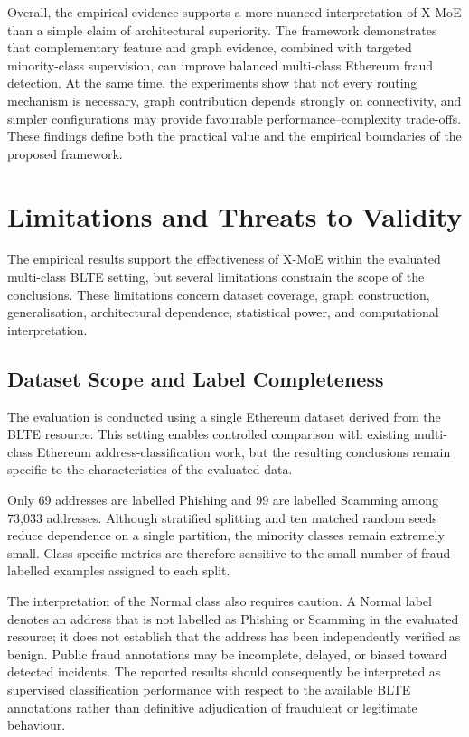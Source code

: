 \documentclass{ieeeaccess}
\begin{document}
Overall, the empirical evidence supports a more nuanced interpretation of X-MoE than a simple claim of architectural superiority. The framework demonstrates that complementary feature and graph evidence, combined with targeted minority-class supervision, can improve balanced multi-class Ethereum fraud detection. At the same time, the experiments show that not every routing mechanism is necessary, graph contribution depends strongly on connectivity, and simpler configurations may provide favourable performance--complexity trade-offs. These findings define both the practical value and the empirical boundaries of the proposed framework.


\section{Limitations and Threats to Validity}

The empirical results support the effectiveness of X-MoE within the evaluated multi-class BLTE setting, but several limitations constrain the scope of the conclusions. These limitations concern dataset coverage, graph construction, generalisation, architectural dependence, statistical power, and computational interpretation.

\subsection{Dataset Scope and Label Completeness}

The evaluation is conducted using a single Ethereum dataset derived from the BLTE resource. This setting enables controlled comparison with existing multi-class Ethereum address-classification work, but the resulting conclusions remain specific to the characteristics of the evaluated data.

Only 69 addresses are labelled Phishing and 99 are labelled Scamming among 73,033 addresses. Although stratified splitting and ten matched random seeds reduce dependence on a single partition, the minority classes remain extremely small. Class-specific metrics are therefore sensitive to the small number of fraud-labelled examples assigned to each split.

The interpretation of the Normal class also requires caution. A Normal label denotes an address that is not labelled as Phishing or Scamming in the evaluated resource; it does not establish that the address has been independently verified as benign. Public fraud annotations may be incomplete, delayed, or biased toward detected incidents. The reported results should consequently be interpreted as supervised classification performance with respect to the available BLTE annotations rather than definitive adjudication of fraudulent or legitimate behaviour.
\end{document}
